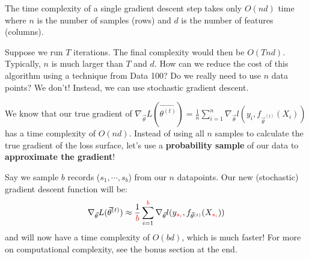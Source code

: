 \documentclass[
  letterpaper,
  DIV=11,
  numbers=noendperiod]{scrreprt}
\begin{document}
The time complexity of a single gradient descent step takes only
\(O(nd)\) time where \(n\) is the number of samples (rows) and \(d\) is
the number of features (columns).

Suppose we run \(T\) iterations. The final complexity would then be
\(O(Tnd)\). Typically, \(n\) is much larger than \(T\) and \(d\). How
can we reduce the cost of this algorithm using a technique from Data
100? Do we really need to use \(n\) data points? We don't! Instead, we
can use stochastic gradient descent.

We know that our true gradient of
\(\nabla_{\vec{\theta}} L (\vec{\theta^{(t)}}) = \frac{1}{n}\sum_{i=1}^{n}\nabla_{\vec{\theta}} l(y_i, f_{\vec{\theta}^{(t)}}(X_i))\)
has a time complexity of \(O(nd)\). Instead of using all \(n\) samples
to calculate the true gradient of the loss surface, let's use a
\textbf{probability sample} of our data to \textbf{approximate the
gradient}!

Say we sample \(b\) records (\(s_1, \cdots, s_b\)) from our \(n\)
datapoints. Our new (stochastic) gradient descent function will be:
\[\nabla_{\vec{\theta}} L (\vec{\theta}^{(t)}) \approx \frac{1}{\textcolor{red}{b}}\sum_{i=1}^{\textcolor{red}{b}}\nabla_{\vec{\theta}} l(y_{\textcolor{red}{s_i}}, f_{\vec{\theta}^{(t)}}(X_{\textcolor{red}{s_i}}))\]
and will now have a time complexity of \(O(bd)\), which is much faster!
For more on computational complexity, see the bonus section at the end.
\end{document}
